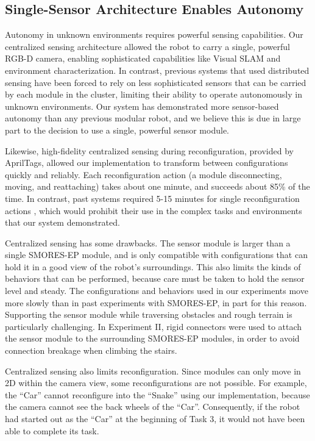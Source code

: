 \documentclass[journal]{IEEEtran}
\begin{document}
\subsection{Single-Sensor Architecture Enables Autonomy}
%
Autonomy in unknown environments requires powerful sensing capabilities.  Our centralized sensing architecture allowed the robot to carry a single, powerful RGB-D camera, enabling sophisticated capabilities like Visual SLAM and environment characterization. In contrast, previous systems that used distributed sensing have been forced to rely on less sophisticated sensors that can be carried by each module in the cluster, limiting their ability to operate autonomously in unknown environments.   Our system has demonstrated more sensor-based autonomy than any previous modular robot, and we believe this is due in large part to the decision to use a single, powerful sensor module.

Likewise, high-fidelity centralized sensing during reconfiguration, provided by AprilTags, allowed our implementation to transform between configurations quickly and reliably.  Each reconfiguration action (a module disconnecting, moving, and reattaching) takes about one minute, and succeeds about 85\% of the time.  In contrast, past systems required 5-15 minutes for single reconfiguration actions \cite{Yim2007, Rubenstein2004,Murata2006}, which would prohibit their use in the complex tasks and environments that our system demonstrated. 

Centralized sensing has some drawbacks.  The sensor module is larger than a single SMORES-EP module, and is only compatible with configurations that can hold it in a good view of the robot's surroundings.  This also limits the kinds of behaviors that can be performed, because care must be taken to hold the sensor level and steady.  The configurations and behaviors used in our experiments move more slowly than in past experiments with SMORES-EP, in part for this reason. Supporting the sensor module while traversing obstacles and rough terrain is particularly challenging.  In Experiment II, rigid connectors were used to attach the sensor module to the surrounding SMORES-EP modules, in order to avoid connection breakage when climbing the stairs. 

Centralized sensing also limits reconfiguration. Since modules can only move in 2D within the camera view,  some reconfigurations are not possible.  For example,  the ``Car'' cannot reconfigure into the ``Snake'' using  our implementation, because the camera cannot see the back wheels of the ``Car''. Consequently, if the robot had started out as the ``Car'' at the beginning of Task 3, it would not have been able to complete its task.
\end{document}
